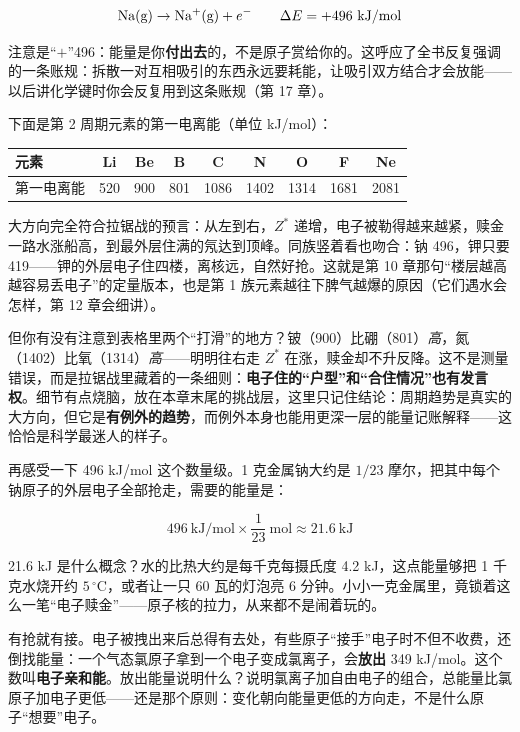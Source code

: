 \[\chem{Na(g)} \rightarrow \chem{Na^{+}(g)} + e^{-} \qquad \Delta E = +496\ \mathrm{kJ/mol}\]

注意是“$+$”496：能量是你\textbf{付出去}的，不是原子赏给你的。这呼应了全书反复强调的一条账规：拆散一对互相吸引的东西永远要耗能，让吸引双方结合才会放能——以后讲化学键时你会反复用到这条账规（第 17 章）。

下面是第 2 周期元素的第一电离能（单位 kJ/mol）：

\begin{table}[htbp]
\centering
\begin{tabular}{lcccccccc}
\toprule
元素 & Li & Be & B & C & N & O & F & Ne \\
\midrule
第一电离能 & 520 & 900 & 801 & 1086 & 1402 & 1314 & 1681 & 2081 \\
\bottomrule
\end{tabular}
\end{table}

大方向完全符合拉锯战的预言：从左到右，$Z^{*}$ 递增，电子被勒得越来越紧，赎金一路水涨船高，到最外层住满的氖达到顶峰。同族竖着看也吻合：钠 496，钾只要 419——钾的外层电子住四楼，离核远，自然好抢。这就是第 10 章那句“楼层越高越容易丢电子”的定量版本，也是第 1 族元素越往下脾气越爆的原因（它们遇水会怎样，第 12 章会细讲）。

但你有没有注意到表格里两个“打滑”的地方？铍（900）比硼（801）\emph{高}，氮（1402）比氧（1314）\emph{高}——明明往右走 $Z^{*}$ 在涨，赎金却不升反降。这不是测量错误，而是拉锯战里藏着的一条细则：\textbf{电子住的“户型”和“合住情况”也有发言权}。细节有点烧脑，放在本章末尾的挑战层，这里只记住结论：周期趋势是真实的大方向，但它是\textbf{有例外的趋势}，而例外本身也能用更深一层的能量记账解释——这恰恰是科学最迷人的样子。

再感受一下 496 kJ/mol 这个数量级。1 克金属钠大约是 $1/23$ 摩尔，把其中每个钠原子的外层电子全部抢走，需要的能量是：

\[496\ \mathrm{kJ/mol} \times \frac{1}{23}\ \mathrm{mol} \approx 21.6\ \mathrm{kJ}\]

21.6 kJ 是什么概念？水的比热大约是每千克每摄氏度 4.2 kJ，这点能量够把 1 千克水烧开约 $5\,^{\circ}\mathrm{C}$，或者让一只 60 瓦的灯泡亮 6 分钟。小小一克金属里，竟锁着这么一笔“电子赎金”——原子核的拉力，从来都不是闹着玩的。

有抢就有接。电子被拽出来后总得有去处，有些原子“接手”电子时不但不收费，还倒找能量：一个气态氯原子拿到一个电子变成氯离子，会\textbf{放出} 349 kJ/mol。这个数叫\textbf{电子亲和能}。放出能量说明什么？说明氯离子加自由电子的组合，总能量比氯原子加电子更低——还是那个原则：变化朝向能量更低的方向走，不是什么原子“想要”电子。

